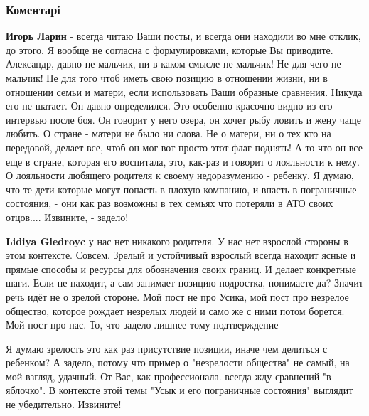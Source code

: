  
 
 
 
 
\subsubsection{Коментарі}

\begin{itemize} %
\textbf{Игорь Ларин} - всегда читаю Ваши посты, и всегда они находили во мне
отклик, до этого. Я вообще не согласна с формулировками, которые Вы приводите.
Александр, давно не мальчик, ни в каком смысле не мальчик! Не для чего не
мальчик! Не для того чтоб иметь свою позицию в отношении жизни, ни в отношении
семьи и матери, если использовать Ваши образные сравнения. Никуда его не
шатает. Он давно определился. Это особенно красочно видно из его интервью после
боя. Он говорит у него озера, он хочет рыбу ловить и жену чаще любить. О стране
- матери не было ни слова. Не о матери, ни о тех кто на передовой, делает все,
чтоб он мог вот просто этот флаг поднять! А то что он все еще в стране, которая
его воспитала, это, как-раз и говорит о лояльности к нему. О лояльности
любящего родителя к своему недоразумению - ребенку. Я думаю, что те дети
которые могут попасть в плохую компанию, и впасть в пограничные состояния, -
они как раз возможны в тех семьях что потеряли в АТО своих отцов.... Извините,
- задело!

\begin{itemize} %
\textbf{Lidiya Giedroyc} у нас нет никакого родителя. У нас нет взрослой стороны в этом контексте. Совсем.
Зрелый и устойчивый взрослый всегда находит ясные и прямые способы и ресурсы для обозначения своих границ.
И делает конкретные шаги.
Если не находит, а сам занимает позицию подростка, понимаете да? Значит речь идёт не о зрелой стороне.
Мой пост не про Усика, мой пост про незрелое общество, которое рождает незрелых людей и само же с ними потом борется.
Мой пост про нас.
То, что задело лишнее тому подтверждение


Я думаю зрелость это как раз присутствие позиции, иначе чем делиться с
ребенком? А задело, потому что пример о "незрелости общества" не самый, на мой
взгляд, удачный. От Вас, как профессионала. всегда жду сравнений "в яблочко". В
контексте этой темы "Усык и его пограничные состояния" выглядит не убедительно.
Извините!


\end{itemize}
\end{itemize}
